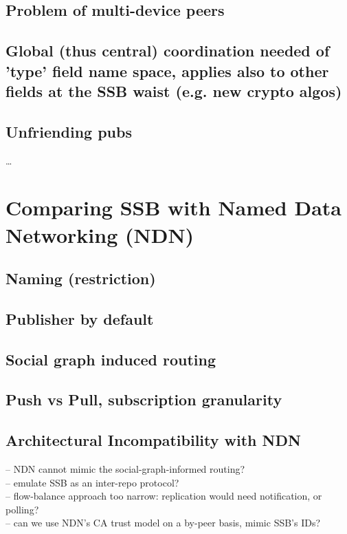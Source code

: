 \documentclass[sigconf]{acmart}
\begin{document}
\subsection{Problem of multi-device peers}

\subsection{Global (thus central) coordination needed of 'type' field
  name space, applies also  to other fields at the SSB waist (e.g. new
  crypto algos)}

\subsection{Unfriending pubs}
\ldots

\section{Comparing SSB with Named Data Networking (NDN)}

\subsection{Naming (restriction)}

\subsection{Publisher by default}

\subsection{Social graph induced routing}

\subsection{Push vs Pull, subscription granularity}

\subsection{Architectural Incompatibility with NDN}

-- NDN cannot mimic the social-graph-informed routing?\\
-- emulate SSB as an inter-repo protocol?\\
-- flow-balance approach too narrow: replication would need notification, or polling?\\
-- can we use NDN's CA trust model on a by-peer basis, mimic SSB's IDs?
\end{document}
